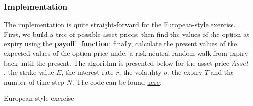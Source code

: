 \subsubsection{Implementation}
The implementation is quite straight-forward for the European-style exercise. First, we build a tree of possible asset prices; then find the values of the option at expiry using the \textbf{payoff\_function}; finally, calculate the present values of the expected values of the option price under a risk-neutral random walk from expiry back until the present. The algorithm is presented below for the asset price $Asset$, the strike value $E$, the interest rate $r$, the volatility $\sigma$, the expiry $T$ and the number of time step $N$. The code can be found \href{https://github.com/chitn/quantfin_study/blob/master/binomial_model-paul_wilmott.py}{here}. 

\vspace{\baselineskip}
\begin{algorithm}[H]
\caption{European-style exercise}
\label{algo:binomial_european}  
\end{algorithm}
\vspace{\baselineskip}

